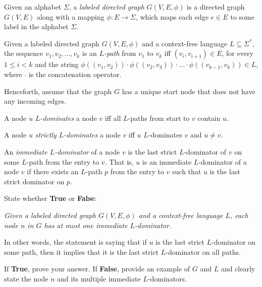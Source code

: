 \documentclass[12pt]{article}
\begin{document}
\begin{enumerate}
      Given an alphabet $\Sigma$, a \emph{labeled directed graph} $G(V, E, \phi)$ is a
      directed graph $G(V, E)$  along with a mapping $\phi \colon E \to \Sigma$,
      which maps each edge $e\in E$ to some label in the alphabet $\Sigma$. 

      Given a labeled directed graph $G(V, E, \phi)$ and a context-free language
      $L \subseteq \Sigma^*$, the sequence $v_1, v_2, \ldots, v_k$ is an
      \emph{$L$-path} from $v_1$ to $v_k$ iff $(v_i,v_{i+1}) \in E$, for every
      $1\leq i < k$ and the string $\phi((v_1, v_2)) \cdot \phi((v_2, v_3)) \cdot \ldots \cdot
      \phi((v_{k-1},v_k)) \in L$, where $\cdot$ is the concatenation operator. 

      Henceforth, assume that the graph $G$ has a unique start node that does
      not have any incoming edges. 

      A node $u$ \emph{$L$-dominates} a node $v$ iff all $L$-paths from start to 
      $v$ contain $u$. 

      A node $u$ \emph{strictly $L$-dominates} a node $v$ iff $u$ $L$-dominates $v$ 
      and $u \neq v$. 

      An \emph{immediate $L$-dominator} of a node $v$ is the last strict
      $L$-dominator of $v$ on some $L$-path from the entry to $v$. That is, $u$
      is an immediate $L$-dominator of a node $v$ if there exists an $L$-path
      $p$ from the entry to $v$ such that $u$ is the last strict dominator on
      $p$.

      State whether \textbf{True} or \textbf{False}: 
    
      \emph{Given a labeled directed graph $G(V,E, \phi)$ and a context-free
      language $L$, each node $n$ in $G$ has at most one immediate $L$-dominator.}

      In other words, the statement is saying that if $u$ is the last strict
      $L$-dominator on some path, then it implies that it is the last strict
      $L$-dominator on all paths. 
    
      If \textbf{True}, prove your answer. If \textbf{False}, provide an example
      of $G$ and $L$ and clearly state the node $n$ and its multiple immediate
      $L$-dominators.
      \begin{mdframed}
      \vspace{3em}
      \end{mdframed}
      
  \end{enumerate}
    
\end{document}
